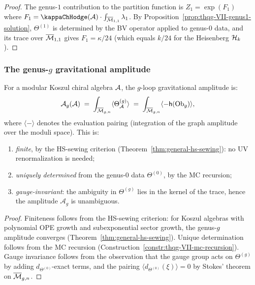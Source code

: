 \begin{proof}
The genus-$1$ contribution to the partition function is
$Z_1 = \exp(F_1)$ where $F_1 = \kappaChHodge(\cA) \cdot
\int_{\overline{\cM}_{1,1}} \lambda_1$. By
Proposition~\ref{prop:thqg-VII-genus1-solution},
$\Theta^{(1)}$ is determined by the BV operator applied to
genus-$0$ data, and its trace over $\overline{\mathcal{M}}_{1,1}$
gives $F_1 = \kappa/24$ (which equals $k/24$ for the Heisenberg $\mathcal{H}_k$).
\end{proof}

\subsubsection{The genus-$g$ gravitational amplitude}

\begin{theorem}
\label{thm:thqg-VII-g-loop-amplitude}
For a modular Koszul chiral algebra $\mathcal{A}$, the $g$-loop
gravitational amplitude is:
\begin{equation}%
\mathcal{A}_g(\cA)
\;=\;
\int_{\overline{\cM}_{g,n}}
\langle \Theta^{(g)}_\cA \rangle
\;=\;
\int_{\overline{\cM}_{g,n}}
\langle -\hCont(\Ob_g) \rangle,
\end{equation}
where $\langle - \rangle$ denotes the evaluation pairing
\textup{(}integration of the graph amplitude over the
moduli space\textup{)}. This is:
\begin{enumerate}[label=\textup{(\roman*)}]
\item \emph{finite}, by the HS-sewing criterion
 \textup{(}Theorem~\textup{\ref{thm:general-hs-sewing}}):
 no UV renormalization is needed;
\item \emph{uniquely determined} from the genus-$0$ data
 $\Theta^{(0)}$, by the MC recursion;
\item \emph{gauge-invariant}: the ambiguity in $\Theta^{(g)}$
 lies in the kernel of the trace, hence the amplitude
 $\mathcal{A}_g$ is unambiguous.
\end{enumerate}
\end{theorem}

\begin{proof}
Finiteness follows from the HS-sewing criterion: for Koszul
algebras with polynomial OPE growth and subexponential sector
growth, the genus-$g$ amplitude converges
(Theorem~\ref{thm:general-hs-sewing}). Unique determination
follows from the MC recursion
(Construction~\ref{constr:thqg-VII-mc-recursion}). Gauge
invariance follows from the observation that the gauge
group acts on $\Theta^{(g)}$ by adding
$d_{\Theta^{(0)}}$-exact terms, and the pairing
$\langle d_{\Theta^{(0)}}(\xi) \rangle = 0$ by Stokes'
theorem on $\overline{\mathcal{M}}_{g,n}$.
\end{proof}

